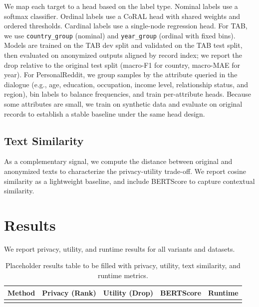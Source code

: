 \documentclass[10pt, a4paper]{article}
\begin{document}
We map each target to a head based on the label type. Nominal labels use a softmax classifier. Ordinal labels use a CoRAL head \cite{cao_coral_2020} with shared weights and ordered thresholds. Cardinal labels use a single-node regression head. For TAB, we use \texttt{country\_group} (nominal) and \texttt{year\_group} (ordinal with fixed bins). Models are trained on the TAB dev split and validated on the TAB test split, then evaluated on anonymized outputs aligned by record index; we report the drop relative to the original test split (macro-F1 for country, macro-MAE for year). For PersonalReddit, we group samples by the attribute queried in the dialogue (e.g., age, education, occupation, income level, relationship status, and region), bin labels to balance frequencies, and train per-attribute heads. Because some attributes are small, we train on synthetic data and evaluate on original records to establish a stable baseline under the same head design.

\subsection{Text Similarity}

As a complementary signal, we compute the distance between original and anonymized texts to characterize the privacy-utility trade-off. We report cosine similarity as a lightweight baseline, and include BERTScore to capture contextual similarity.

\section{Results}

We report privacy, utility, and runtime results for all variants and datasets.

\begin{table}[!htp]
\centering
\small
\setlength{\tabcolsep}{4pt}
\begin{tabularx}{\columnwidth}{|l|X|X|X|X|}
\hline
\textbf{Method} & \textbf{Privacy (Rank)} & \textbf{Utility (Drop)} & \textbf{BERTScore} & \textbf{Runtime} \\
\hline
 &  &  &  &  \\
\hline
\end{tabularx}
\caption{Placeholder results table to be filled with privacy, utility, text similarity, and runtime metrics.}
\label{tab:results-overview}
\end{table}

\end{document}
